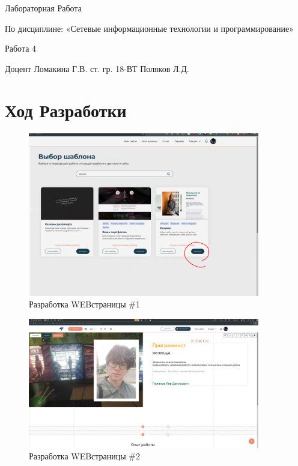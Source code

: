 \documentclass[14pt]{extarticle}
\let\oldsection\section
\renewcommand\section{\clearpage\oldsection}
\begin{document}
\unititle
{\klgtu}
{\fapu}
{\suvt}
{Лабораторная Работа}
{По дисциплине: «Сетевые информационные технологии и программирование» \par Работа 4}
{Доцент}
{Ломакина Г.В.}
{ст. гр. 18-ВТ}
{Поляков Л.Д.}

\tableofcontents


\section{Ход Разработки}

\begin{figure}[h]
    \centering
	\includegraphics[width=0.9\textwidth, angle=0]{2021-12-12_18-00}
    \caption{Разработка WEB\-страницы \#1}
    \label{fig:html1}
\end{figure}

\begin{figure}[h]
    \centering
	\includegraphics[width=0.9\textwidth, angle=0]{2021-10-19-22-25-30}
    \caption{Разработка WEB\-страницы \#2}
    \label{fig:html2}
\end{figure}
\end{document}
